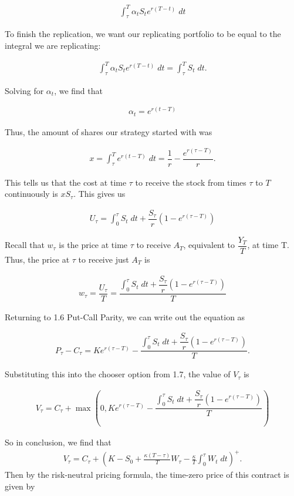 \documentclass[reqno]{amsart}
\begin{document}
\begin{align}
     \int_\tau^T \alpha_t S_t e^{r(T-t)} \; dt
\end{align}

To finish the replication, we want our replicating portfolio to be equal to the integral we are replicating:

\begin{align}
     \int_\tau^T \alpha_t S_t e^{r(T-t)} \; dt = \int_\tau^T S_t \; dt.
\end{align}

Solving for $\alpha_t$, we find that

\begin{align}
     \alpha_t = e^{r(t-T)}
\end{align}

Thus, the amount of shares our strategy started with was

\begin{align}
     x = \int_\tau^T e^{r(t-T)} \; dt = \dfrac{1}{r} - \dfrac{e^{r(\tau - T)}}{r}.
\end{align}

This tells us that the cost at time $\tau$ to receive the stock from times $\tau$ to $T$ continuously is $x S_\tau$. This gives us 

\begin{align}
     U_\tau = \int_0^\tau S_t \; dt + \dfrac{S_\tau}{r}\left( 1 - e^{r(\tau - T)} \right)
\end{align}

Recall that $w_\tau$ is the price at time $\tau$ to receive $A_T$, equivalent to $\dfrac{Y_T}{T}$, at time T.
Thus, the price at $\tau$ to receive just $A_T$ is 

\begin{align}
     w_\tau = \dfrac{U_\tau}{T} = \dfrac{\int_0^\tau S_t \; dt + \dfrac{S_\tau}{r}\left( 1 - e^{r(\tau - T)} \right)}{T}
\end{align}

Returning to 1.6 Put-Call Parity, we can write out the equation as

\begin{align}
     P_\tau - C_\tau = Ke^{r(\tau - T)} - \dfrac{\int_0^\tau S_t \; dt + \dfrac{S_\tau}{r}\left( 1 - e^{r(\tau - T)} \right)}{T}.
\end{align}

Substituting this into the chooser option from 1.7, the value of $V_\tau$ is

\begin{align}
     V_\tau = C_\tau + \max(0, Ke^{r(\tau - T)} - \dfrac{\int_0^\tau S_t \; dt + \dfrac{S_\tau}{r}\left( 1 - e^{r(\tau - T)} \right)}{T})
\end{align}

So in conclusion, we find that 
\begin{align}
     V_\tau = C_\tau + \left(K- S_0 + \frac{\kappa(T-\tau)}{T} W_\tau - \frac{\kappa}{T} \int_0^\tau W_t \; dt  \right)^+.
\end{align}
Then by the risk-neutral pricing formula, the time-zero price of this contract is given by 
\end{document}
